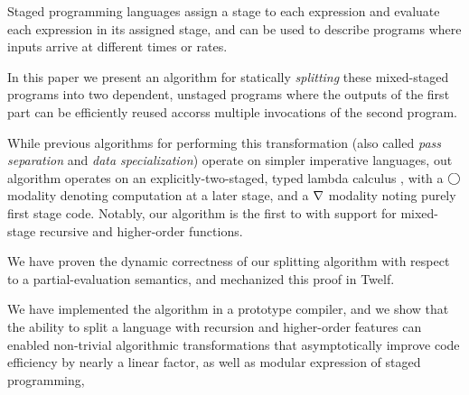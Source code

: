 
Staged programming languages assign a stage to each expression and
evaluate each expression in its assigned stage,
and can be used to describe programs where inputs arrive at different times or rates.

In this paper we present an 
algorithm for statically {\em splitting} these mixed-staged programs 
into two dependent, unstaged programs where the outputs of the first part can be efficiently reused accorss multiple invocations of the second program.  


While previous algorithms for performing this transformation 
(also called \emph{pass separation} and \emph{data specialization}) operate on simpler imperative languages,
out algorithm operates on an explicitly-two-staged, typed lambda calculus \lang, 
with a $\bigcirc$ modality denoting computation at a later stage,
and a $\nabla$ modality noting purely first stage code.
Notably, our algorithm is the first to with support for mixed-stage recursive and higher-order functions.

We have proven the dynamic correctness of our splitting algorithm with respect
to a partial-evaluation semantics, and mechanized this proof in Twelf.

We have implemented the algorithm in a prototype compiler,
and we show that the ability to split a language with recursion and higher-order features
can enabled non-trivial algorithmic transformations that asymptotically improve code efficiency by nearly a linear factor,
as well as modular expression of staged programming, 
